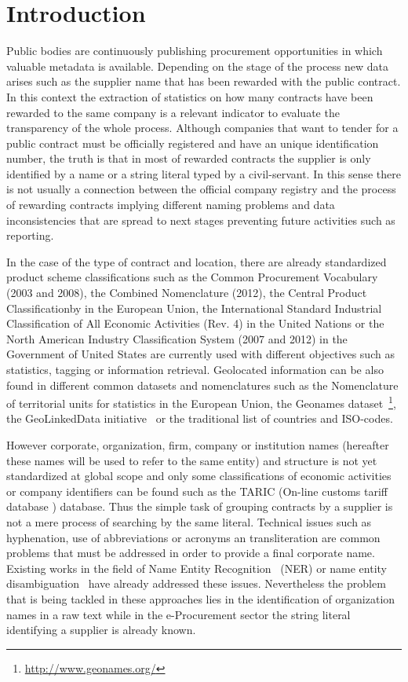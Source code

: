 \documentclass{llncs}
\begin{document}
\section{Introduction}
Public bodies are continuously publishing procurement opportunities in which 
valuable metadata is available. Depending on the stage of the process new data arises such 
as the supplier name that has been rewarded with the public contract. In this 
context the extraction of statistics on how many contracts have been 
rewarded to the same company is a relevant indicator to evaluate the transparency 
of the whole process. Although companies that want to tender for a public contract must be 
officially registered and have an unique identification number, the truth is 
that in most of rewarded contracts the supplier is only identified by a name or a string literal typed 
by a civil-servant. In this sense there is not usually a connection between 
the official company registry and the process of rewarding contracts implying different 
naming problems and data inconsistencies that are spread to next stages preventing future 
activities such as reporting.

In the case of the type of contract and location, there are already standardized~\cite{DBLP:journals/ijseke/AlvarezLSASL12} product 
scheme classifications such as the Common Procurement Vocabulary (2003 and 2008), the Combined Nomenclature (2012), 
the Central Product Classificationby in the European Union, the International Standard Industrial Classification of 
All Economic Activities (Rev. 4) in the United Nations or the North American Industry Classification System (2007 and 2012) 
in the Government of United States are currently used with different objectives such as statistics, tagging or 
information retrieval. Geolocated information can be also found in different common datasets and nomenclatures such as 
the Nomenclature of territorial units for statistics in the European Union, the Geonames dataset~\footnote{\url{http://www.geonames.org/}}, the GeoLinkedData 
initiative~\cite{DBLP:conf/dexa/Lopez-PellicerSCZM10} or the traditional list of countries and ISO-codes.

However corporate, organization, firm, company or institution names (hereafter these names will be used to refer to 
the same entity) and structure is not yet standardized at global scope and only some classifications of economic activities or 
company identifiers can be found such as the TARIC (On-line customs tariff database ) database. Thus the simple task of grouping contracts by a supplier is not a mere process of 
searching by the same literal. Technical issues such as hyphenation, use of abbreviations or acronyms an transliteration are common problems that must be addressed in order 
to provide a final corporate name. Existing works in the field of Name Entity Recognition~\cite{citeulike:1657521} (NER) or 
name entity disambiguation~\cite{Sarmento:2009:AWN:1602022.1602085,Klein:2003:NER:1119176.1119204} have already addressed these issues. 
Nevertheless the problem that is being tackled in these approaches lies in the identification of organization names in 
a raw text while in the e-Procurement sector the string literal identifying a supplier is already known.
\end{document}
